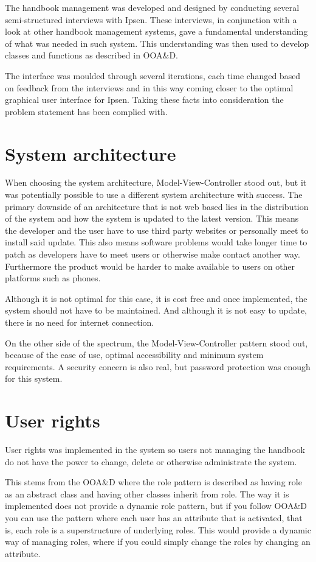 The handbook management was developed and designed by conducting several semi-structured interviews with Ipsen.
These interviews, in conjunction with a look at other handbook management systems, gave a fundamental understanding of what was needed in such system.
This understanding was then used to develop classes and functions as described in OOA\&D\cite{Rod-Aalborg}.

The interface was moulded through several iterations, each time changed based on feedback from the interviews and in this way coming closer to the optimal graphical user interface for Ipsen.
Taking these facts into consideration the problem statement has been complied with.

\section{System architecture}
When choosing the system architecture, Model-View-Controller stood out, but it was potentially possible to use a different system architecture with success.
The primary downside of an architecture that is not web based lies in the distribution of the system and how the system is updated to the latest version.
This means the developer and the user have to use third party websites or personally meet to install said update.
This also means software problems would take longer time to patch as developers have to meet users or otherwise make contact another way.
Furthermore the product would be harder to make available to users on other platforms such as phones.

Although it is not optimal for this case, it is cost free and once implemented, the system should not have to be maintained.
And although it is not easy to update, there is no need for internet connection.

On the other side of the spectrum, the Model-View-Controller pattern stood out, because of the ease of use, optimal accessibility and minimum system requirements.
A security concern is also real, but password protection was enough for this system.

\section{User rights}

User rights was implemented in the system so users not managing the handbook do not have the power to change, delete or otherwise administrate the system.

This stems from the OOA\&D where the role pattern is described as having role as an abstract class and having other classes inherit from role.
The way it is implemented does not provide a dynamic role pattern, but if you follow OOA\&D you can use the pattern where each user has an attribute that is activated, that is, each role is a superstructure of underlying roles.
This would provide a dynamic way of managing roles, where if you could simply change the roles by changing an attribute.

